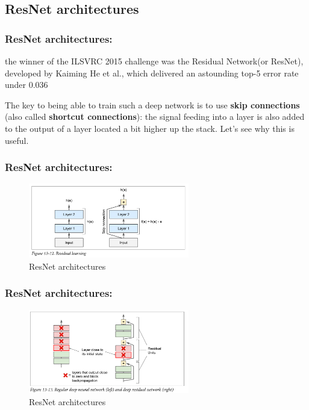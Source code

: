 \documentclass{beamer}
\begin{document}
\subsection{ResNet architectures}
    \begin{frame}
    \frametitle{ResNet architectures: }
    \par
     the winner of the ILSVRC 2015 challenge was the Residual Network(or ResNet), developed by Kaiming He et al., which delivered an astounding top-5 error rate under 0.036
     \par
      The key to being able to train such a deep network is to use \textbf{skip connections} (also called \textbf{shortcut connections}): the signal feeding into a layer is also added to the output of a layer located a bit higher up the stack. Let’s see why this is useful.
    \end{frame}
    \begin{frame}
    \frametitle{ResNet architectures: }
         \begin{figure}[H]
            \begin{center}
                \includegraphics[width=7cm]{FIGURE13-4.png}
            \end{center}
        \caption{ResNet architectures}
        \end{figure}
    \end{frame}

    \begin{frame}
    \frametitle{ResNet architectures: }
         \begin{figure}[H]
            \begin{center}
                \includegraphics[width=7cm]{FIGURE13-5.png}
            \end{center}
        \caption{ResNet architectures}
        \end{figure}
    \end{frame}
\end{document}
